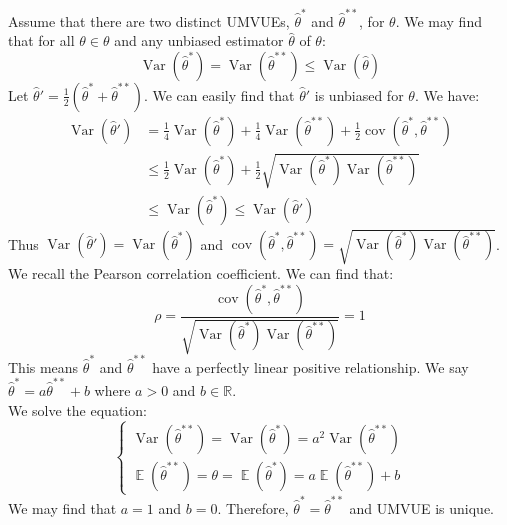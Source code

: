 \documentclass{huhtakm-template-book-v2}
\DeclareMathOperator{\E}{\mathbb{E}}
\DeclareMathOperator{\Var}{Var}
\DeclareMathOperator{\cov}{cov}
\begin{document}
\begin{proofing}
	Assume that there are two distinct UMVUEs, $\hat{\theta}^{*}$ and $\hat{\theta}^{**}$, for $\theta$. We may find that for all $\theta\in\theta$ and any unbiased estimator $\hat{\theta}$ of $\theta$:
	\begin{equation*}
		\Var(\hat{\theta}^{*})=\Var(\hat{\theta}^{**})\leq\Var(\hat{\theta})
	\end{equation*}
	Let $\hat{\theta}'=\frac{1}{2}(\hat{\theta}^{*}+\hat{\theta}^{**})$. We can easily find that $\hat{\theta}'$ is unbiased for $\theta$. We have:
	\begin{align*}
		\Var(\hat{\theta}')&=\frac{1}{4}\Var(\hat{\theta}^{*})+\frac{1}{4}\Var(\hat{\theta}^{**})+\frac{1}{2}\cov(\hat{\theta}^{*},\hat{\theta}^{**})\\
		&\leq\frac{1}{2}\Var(\hat{\theta}^{*})+\frac{1}{2}\sqrt{\Var(\hat{\theta}^{*})\Var(\hat{\theta}^{**})}\\
		&\leq\Var(\hat{\theta}^{*})\leq\Var(\hat{\theta}')
	\end{align*}
	Thus $\Var(\hat{\theta}')=\Var(\hat{\theta}^{*})$ and $\cov(\hat{\theta}^{*},\hat{\theta}^{**})=\sqrt{\Var(\hat{\theta}^{*})\Var(\hat{\theta}^{**})}$.\\
	We recall the Pearson correlation coefficient. We can find that:
	\begin{equation*}
		\rho=\frac{\cov(\hat{\theta}^{*},\hat{\theta}^{**})}{\sqrt{\Var(\hat{\theta}^{*})\Var(\hat{\theta}^{**})}}=1
	\end{equation*}
	This means $\hat{\theta}^{*}$ and $\hat{\theta}^{**}$ have a perfectly linear positive relationship. We say $\hat{\theta}^{*}=a\hat{\theta}^{**}+b$ where $a>0$ and $b\in\mathbb{R}$.\\
	We solve the equation:
	\begin{equation*}
		\begin{cases}
			\Var(\hat{\theta}^{**})=\Var(\hat{\theta}^{*})=a^{2}\Var(\hat{\theta}^{**})\\
			\E(\hat{\theta}^{**})=\theta=\E(\hat{\theta}^{*})=a\E(\hat{\theta}^{**})+b
		\end{cases}
	\end{equation*}
	We may find that $a=1$ and $b=0$. Therefore, $\hat{\theta}^{*}=\hat{\theta}^{**}$ and UMVUE is unique.
\end{proofing}
\end{document}
